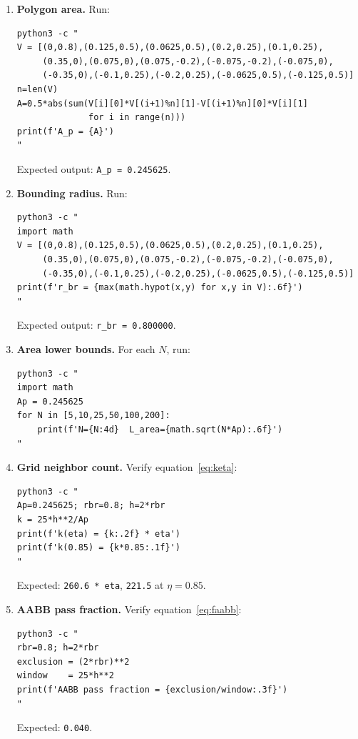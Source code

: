 \documentclass[11pt,oneside]{article}
\begin{document}
\begin{enumerate}[leftmargin=*,label=\textbf{\arabic*.}]

\item \textbf{Polygon area.} Run:
\begin{lstlisting}[style=bashstyle]
python3 -c "
V = [(0,0.8),(0.125,0.5),(0.0625,0.5),(0.2,0.25),(0.1,0.25),
     (0.35,0),(0.075,0),(0.075,-0.2),(-0.075,-0.2),(-0.075,0),
     (-0.35,0),(-0.1,0.25),(-0.2,0.25),(-0.0625,0.5),(-0.125,0.5)]
n=len(V)
A=0.5*abs(sum(V[i][0]*V[(i+1)%n][1]-V[(i+1)%n][0]*V[i][1]
              for i in range(n)))
print(f'A_p = {A}')
"
\end{lstlisting}
Expected output: \texttt{A\_p = 0.245625}.

\item \textbf{Bounding radius.} Run:
\begin{lstlisting}[style=bashstyle]
python3 -c "
import math
V = [(0,0.8),(0.125,0.5),(0.0625,0.5),(0.2,0.25),(0.1,0.25),
     (0.35,0),(0.075,0),(0.075,-0.2),(-0.075,-0.2),(-0.075,0),
     (-0.35,0),(-0.1,0.25),(-0.2,0.25),(-0.0625,0.5),(-0.125,0.5)]
print(f'r_br = {max(math.hypot(x,y) for x,y in V):.6f}')
"
\end{lstlisting}
Expected output: \texttt{r\_br = 0.800000}.

\item \textbf{Area lower bounds.} For each $N$, run:
\begin{lstlisting}[style=bashstyle]
python3 -c "
import math
Ap = 0.245625
for N in [5,10,25,50,100,200]:
    print(f'N={N:4d}  L_area={math.sqrt(N*Ap):.6f}')
"
\end{lstlisting}

\item \textbf{Grid neighbor count.} Verify equation~\eqref{eq:keta}:
\begin{lstlisting}[style=bashstyle]
python3 -c "
Ap=0.245625; rbr=0.8; h=2*rbr
k = 25*h**2/Ap
print(f'k(eta) = {k:.2f} * eta')
print(f'k(0.85) = {k*0.85:.1f}')
"
\end{lstlisting}
Expected: \texttt{260.6 * eta}, \texttt{221.5} at $\eta = 0.85$.

\item \textbf{AABB pass fraction.} Verify equation~\eqref{eq:faabb}:
\begin{lstlisting}[style=bashstyle]
python3 -c "
rbr=0.8; h=2*rbr
exclusion = (2*rbr)**2
window    = 25*h**2
print(f'AABB pass fraction = {exclusion/window:.3f}')
"
\end{lstlisting}
Expected: \texttt{0.040}.


\end{enumerate}
\end{document}
